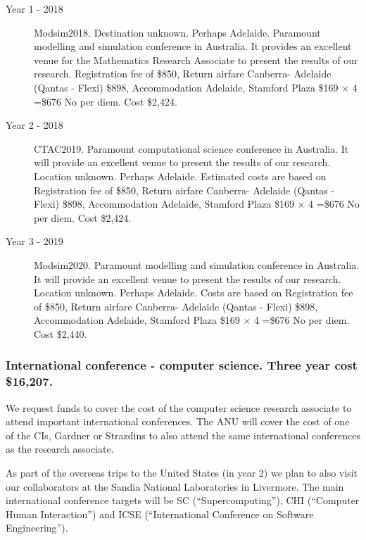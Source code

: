 \documentclass[a4paper,fontsize=12pt]{scrartcl}
\begin{document}
\begin{description}
\item[Year 1 - 2018] Modsim2018. Destination unknown. Perhaps Adelaide.
Paramount modelling and simulation conference in Australia. It provides an excellent venue for the Mathematics Research Associate to present the results of our research. 
Registration fee of \$850, 
Return airfare Canberra- Adelaide (Qantas - Flexi) \$898,
Accommodation Adelaide, Stamford Plaza \$169 $\times$ 4 =\$676
No per diem. Cost \$2,424.



\item[Year 2 - 2018] CTAC2019.
Paramount computational science conference in Australia. It will provide an excellent venue to present the results of our research. Location unknown. Perhaps Adelaide.
Estimated costs are based on 
Registration fee of \$850, 
Return airfare Canberra- Adelaide (Qantas - Flexi) \$898,
Accommodation Adelaide, Stamford Plaza \$169 $\times$ 4 =\$676
No per diem. Cost \$2,424.

\item[Year 3 - 2019] Modsim2020.
Paramount modelling and simulation conference in Australia. It will provide an excellent venue to present the results of our research. Location unknown. Perhaps Adelaide.
Costs are based on 
Registration fee of \$850, 
Return airfare Canberra- Adelaide (Qantas - Flexi) \$898,
Accommodation Adelaide, Stamford Plaza \$169 $\times$ 4 =\$676
No per diem. Cost \$2,440.




\end{description}

\subsubsection*{International conference - computer science. Three year cost \$16,207.}


We request funds to cover the cost of the computer science research associate to attend important international conferences.    
The ANU will cover the cost of one of the CIs, Gardner or Strazdins to also attend the same international conferences as the research associate. 

As part of the overseas trips to the United States (in year 2) we plan to also visit our collaborators at the Sandia National Laboratories in Livermore. The main international conference targets will be SC (``Supercomputing''), CHI (``Computer Human Interaction'') and ICSE (``International Conference on Software Engineering'').
\end{document}
